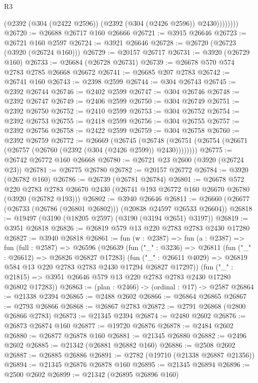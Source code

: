 \begin{lexlean}{R3}
\begin{coremodule}
                (@2392 (@304 (@2422 @2596)) (@2392 (@304 (@2426 @2596)) @2430))))))))
@26720 := @26688 @26717 @160 @26666
@26721 := @3915 @26646
@26723 := @26721 @160 @2597
@26724 := @3921 @26646
@26728 := @26720 (@26723 (@3920 (@26724 @160)))
@26729 := @20157 @26717
@26731 := @3920 (@26729 @160)
@26733 := @26684 (@26728 @26731)
@26739 := @26678 @570 @574 @2783 @2785 @26668 @26672
@26741 := @26685 @207 @2783
@26742 := @26741 @160
@26743 := @2398 @2599
@26744 := @304 @26743
@26745 := @2392 @26744
@26746 := @2402 @2599
@26747 := @304 @26746
@26748 := @2392 @26747
@26749 := @2406 @2599
@26750 := @304 @26749
@26751 := @2392 @26750
@26752 := @2410 @2599
@26753 := @304 @26752
@26754 := @2392 @26753
@26755 := @2418 @2599
@26756 := @304 @26755
@26757 := @2392 @26756
@26758 := @2422 @2599
@26759 := @304 @26758
@26760 := @2392 @26759
@26772 := @26669
    (@26745
      (@26748 (@26751 (@26754 (@26671 (@26757 (@26760 (@2392 (@304 (@2426 @2599)) @2430))))))))
@26775 := @26742 @26772 @160 @26668
@26780 := @26721 @23 @2600 (@3920 (@26724 @23))
@26781 := @26775 @26780
@26782 := @20157 @26772
@26784 := @3920 (@26782 @160)
@26786 := @26739 (@26781 @26784)
@26801 := @26678
    @572
    @220
    @2783
    @2783
    @26670
    @2430
    (@26741 @193 @26772 @160 @26670 @26780 (@3920 (@26782 @193)))
@26802 := @3940 @26646
@26811 := @26660 (@26677 (@26733 (@26786 (@26801 @26802))) (@20838 @24597 @26533 @26604))
@26818 := @19497 (@3190 (@18205 @2597) (@3190 (@3194 @2651) @3197))
@26819 := @3951 @26818
@26826 := @26819 @579 @13 @220 @2783 @2783 @2430 @17280
@26827 := @3940 @26818
@26861 := fun (w : @2387) =>
  fun (a : @2387) =>
  fun (full : @2587) =>
  @26596
    (@26639
      (fun ("_" : @3236) =>
      @26811
        (fun ("_" : @26612) => @26826 @26827 @17283)
        (fun ("_" : @26611 @4029) => @26819 @584 @13 @220 @2783 @2783 @2430 @17294 @26827 @17297))
      (fun ("_" : @21815) => @3951 @26646 @579 @13 @220 @2783 @2783 @2430 @17280 @26802 @17283))
@26863 := (plan : @2466) -> (ordinal : @17) -> @2587
@26864 := @21338 @2394
@26865 := @2488 @2602
@26866 := @26864 @26865
@26867 := @2793 @26866
@26868 := @26867 @2783
@26872 := @2791 @26868 (@2800 @26866 @2783)
@26873 := @21345 @2394
@26874 := @2480 @2602
@26876 := @26873 @26874 @160
@26877 := @19720 @26876
@26878 := @2484 @2602
@26880 := @26877 @26878 @160
@26881 := @21345 @26880
@26882 := @2496 @2602
@26885 := @21342 (@26881 @26882 @160)
@26886 := @2508 @2602
@26887 := @26885 @26886
@26891 := @2782 (@19710 (@21338 @26887 @21356))
@26894 := @21345 @26876 @26878 @160
@26895 := @21345 @26894
@26896 := @2500 @2602
@26899 := @21342 (@26895 @26896 @160)

\end{coremodule}
\end{lexlean}
